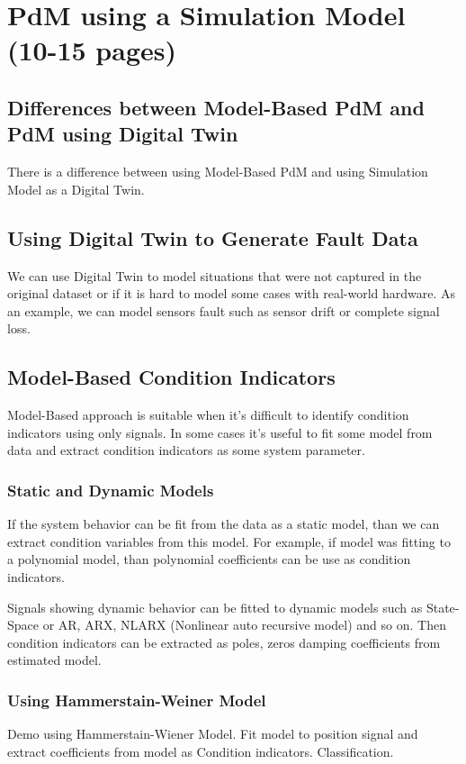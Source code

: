 \documentclass[class=article, crop=false]{standalone}
\begin{document}
\tableofcontents

\section{PdM using a Simulation Model (10-15 pages)}

\subsection{Differences between Model-Based PdM and PdM using Digital Twin}
There is a difference between using Model-Based PdM and using Simulation
Model as a Digital Twin.

\subsection{Using Digital Twin to Generate Fault Data}
We can use Digital Twin to model situations that were not captured in the
original dataset or if it is hard to model some cases with real-world
hardware. As an example, we can model sensors fault such as sensor drift or
complete signal loss.

\subsection{Model-Based Condition Indicators}
Model-Based approach is suitable when it's difficult to identify condition
indicators using only signals. In some cases it's useful to fit some model
from data and extract condition indicators as some system parameter.

\subsubsection{Static and Dynamic Models}
If the system behavior can be fit from the data as a static model, than we
can extract condition variables from this model. For example, if model
was fitting to a polynomial model, than polynomial coefficients can be use
as condition indicators.

Signals showing dynamic behavior can be fitted to dynamic models such as
State-Space or AR, ARX, NLARX (Nonlinear auto recursive model) and so on.
Then condition indicators can be extracted as poles, zeros damping
coefficients from estimated model.


\subsubsection{Using Hammerstain-Weiner Model}
Demo using Hammerstain-Wiener Model. Fit model to position signal and
extract coefficients from model as Condition indicators. Classification.
\end{document}
